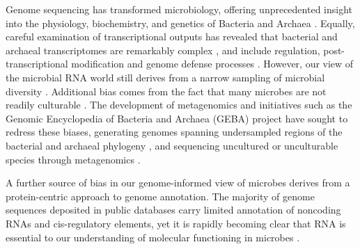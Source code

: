 \documentclass[10pt]{article}
\begin{document}
Genome sequencing has transformed microbiology, offering unprecedented
insight into the physiology, biochemistry, and genetics of Bacteria
and Archaea \cite{Wu:2009,Rinke:2013,Loman:2012,Chun:2014}. Equally,
careful examination of transcriptional outputs has revealed that
bacterial and archaeal transcriptomes are remarkably complex
\cite{Sorek:2011}, and include regulation, post-transcriptional
modification and genome defense processes
\cite{Storz:2011,Dennis:2001,Horvath:2010,Breaker:2012,Cech:2014}. However,
our view of the microbial RNA world still derives from a narrow
sampling of microbial diversity \cite{Pagani:2012}. Additional bias
comes from the fact that many microbes are not readily culturable
\cite{Stewart:2012}. The development of metagenomics and initiatives
such as the Genomic Encyclopedia of Bacteria and Archaea (GEBA)
project have sought to redress these biases, generating genomes
spanning undersampled regions of the bacterial and archaeal phylogeny
\cite{Wu:2009}, and sequencing uncultured or unculturable species
through metagenomics
\cite{Elkins:2008,Konneke:2005,Tyson:2004,Woyke:2006,Rinke:2013}.

A further source of bias in our genome-informed view of microbes
derives from a protein-centric approach to genome annotation. The
majority of genome sequences deposited in public databases carry
limited annotation of noncoding RNAs and cis-regulatory elements, yet
it is rapidly becoming clear that RNA is essential to our
understanding of molecular functioning in microbes \cite{mandin2013rna}. 
\end{document}
